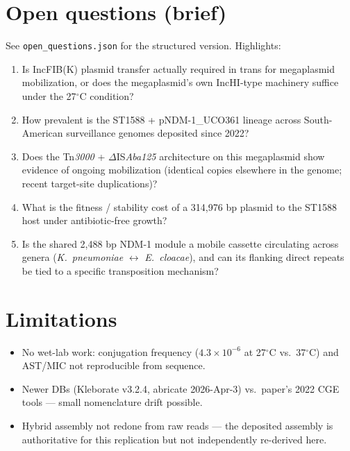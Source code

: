 \documentclass[11pt]{article}
\begin{document}
\section{Open questions (brief)}
See \texttt{open\_questions.json} for the structured version. Highlights:
\begin{enumerate}[leftmargin=1.5em,itemsep=2pt]
  \item Is IncFIB(K) plasmid transfer actually required in trans for
    megaplasmid mobilization, or does the megaplasmid's own IncHI-type
    machinery suffice under the 27$^\circ$C condition?
  \item How prevalent is the ST1588 + pNDM-1\_UCO361 lineage across
    South-American surveillance genomes deposited since 2022?
  \item Does the Tn\emph{3000} + $\Delta$IS\emph{Aba125} architecture on
    this megaplasmid show evidence of ongoing mobilization (identical
    copies elsewhere in the genome; recent target-site duplications)?
  \item What is the fitness / stability cost of a 314{,}976 bp plasmid to
    the ST1588 host under antibiotic-free growth?
  \item Is the shared 2{,}488 bp NDM-1 module a mobile cassette
    circulating across genera (\emph{K.\ pneumoniae} $\leftrightarrow$
    \emph{E.\ cloacae}), and can its flanking direct repeats be tied to
    a specific transposition mechanism?
\end{enumerate}

\section{Limitations}
\begin{itemize}[leftmargin=1.5em,itemsep=2pt]
  \item No wet-lab work: conjugation frequency ($4.3\times10^{-6}$ at
    27$^\circ$C vs.\ 37$^\circ$C) and AST/MIC not reproducible from
    sequence.
  \item Newer DBs (Kleborate v3.2.4, abricate 2026-Apr-3) vs.\ paper's
    2022 CGE tools --- small nomenclature drift possible.
  \item Hybrid assembly not redone from raw reads --- the deposited
    assembly is authoritative for this replication but not independently
    re-derived here.
\end{itemize}
\end{document}
